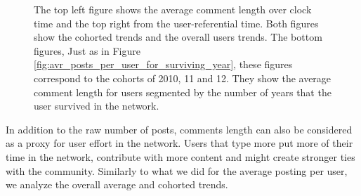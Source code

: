 \begin{figure}[!tb]
\begin{subfigure}{1\textwidth}
\caption{}\end{subfigure}
\caption{The top left figure shows the average comment length over clock time and the top right from the user-referential time. Both figures show the cohorted trends and the overall users trends. The bottom figures, Just as in Figure \ref{fig:avr_posts_per_user_for_surviving_year}, these figures correspond to the cohorts of 2010, 11 and 12. They show the average comment length for users segmented by the number of years that the user survived in the network.}
\label{fig:comment_length}
\end{figure}

In addition to the raw number of posts, comments length can also be considered as a proxy for user effort in the network. Users that type more put more of their time in the network, contribute with more content and might create stronger ties with the community. Similarly to what we did for the average posting per user, we analyze the overall average and cohorted trends.



